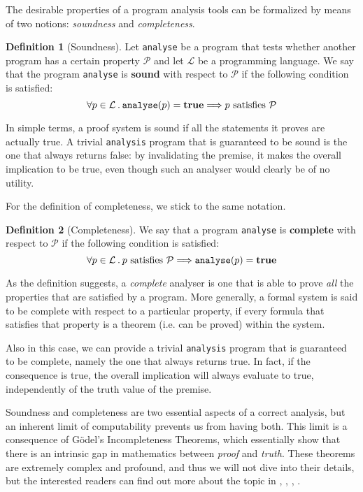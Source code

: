\documentclass[12pt,a4paper]{book}
\newcommand{\st}{\hspace{2px}.\hspace{2px}}
\theoremstyle{definition}
\newtheorem{defn}{Definition}
\begin{document}
	The desirable properties of a program analysis tools can be formalized by means of two notions: \textit{soundness} and \textit{completeness}.
	
	\begin{defn}[Soundness]
		Let \texttt{analyse} be a program that tests whether another program has a certain property $\mathcal{P}$ and let $\mathcal{L}$ be a programming language. We say that the program \texttt{analyse} is \textbf{sound} with respect to $\mathcal{P}$ if the following condition is satisfied:
		\[
		\forall p \in \mathcal{L} \st \text{\texttt{analyse}}(p) = \text{\textbf{true}} \Longrightarrow p \text{ satisfies } \mathcal{P}
		\]
	\end{defn}
	In simple terms, a proof system is sound if all the statements it proves are actually true. A trivial \texttt{analysis} program that is guaranteed to be sound is the one that always returns false: by invalidating the premise, it makes the overall implication to be true, even though such an analyser would clearly be of no utility.
	
	For the definition of completeness, we stick to the same notation.
	\begin{defn}[Completeness]
		We say that a program \texttt{analyse} is \textbf{complete} with respect to $\mathcal{P}$ if the following condition is satisfied:
		\[
		\forall p \in \mathcal{L} \st p \text{ satisfies } \mathcal{P} \Longrightarrow \text{\texttt{analyse}}(p) = \text{\textbf{true}} 
		\]
	\end{defn}
	As the definition suggests, a \textit{complete} analyser is one that is able to prove \textit{all} the properties that are satisfied by a program. More generally, a formal system is said to be complete with respect to a particular property, if every formula that satisfies that property is a theorem (i.e. can be proved) within the system.
	
	Also in this case, we can provide a trivial \texttt{analysis} program that is guaranteed to be complete, namely the one that always returns true. In fact, if the consequence is true, the overall implication will always evaluate to true, independently of the truth value of the premise.
	
	Soundness and completeness are two essential aspects of a correct analysis, but an inherent limit of computability prevents us from having both. This limit is a consequence of Gödel's Incompleteness Theorems, which essentially show that there is an intrinsic gap in mathematics between \textit{proof} and \textit{truth}. These theorems are extremely complex and profound, and thus we will not dive into their details, but the interested readers can find out more about the topic in \cite{DovierGiaco}, \cite{Odifreddi1989}, \cite{Rogers1987}, \cite{Hinman2007}.
\end{document}
